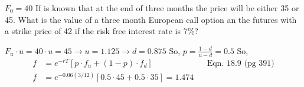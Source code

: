\documentclass[12pt]{article}
\newenvironment{problem}[3][Problem]{\begin{trivlist}
\item[\hskip \labelsep {\bfseries #1}\hskip \labelsep {\bfseries #2.}]}{\end{trivlist}}
\begin{document}
\begin{problem}{18.22}. $F_0 = 40$ If is known that at the end of three months the price will be either 35 or 45. What is the value of a three month European call option an the futures with a strike price of 42 if the risk free interest rate is 7\%?

$F_u \cdot u = 40 \cdot u = 45 \rightarrow u = 1.125 \rightarrow d= 0.875$ So, $p = \frac{1-d}{u-d} = 0.5$ So,
\begin{align*}
f&=e^{-rT}[p\cdot f_u + (1-p)\cdot f_d] && \text{Eqn. 18.9 (pg 391)} \\
f&=e^{-0.06 (3/12)}[0.5\cdot 45 + 0.5\cdot 35] = 1.474 
\end{align*}
\end{problem}
\end{document}
